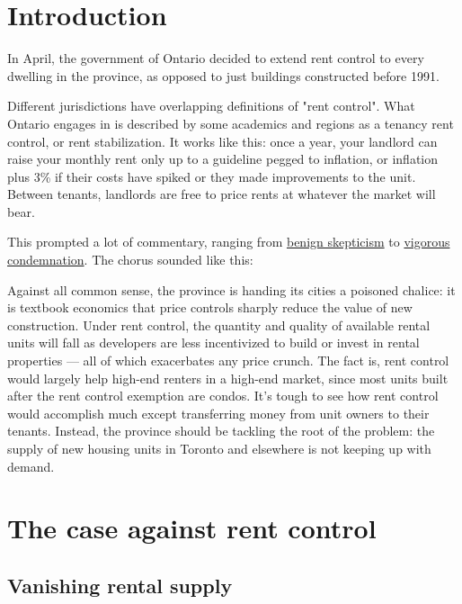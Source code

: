 \section{Introduction}

In April, the government of Ontario decided to extend rent control to every dwelling in the province, as opposed to just buildings constructed before 1991.

Different jurisdictions have overlapping definitions of "rent control". What Ontario engages in is described by some academics and regions as a tenancy rent control, or rent stabilization. It works like this: once a year, your landlord can raise your monthly rent only up to a guideline pegged to inflation, or inflation plus 3\% if their costs have spiked or they made improvements to the unit. Between tenants, landlords are free to price rents at whatever the market will bear.\cite{ltb-2017}

This prompted a lot of commentary, ranging from \href{http://tvo.org/article/current-affairs/the-next-ontario/ontario-needs-a-rental-rethink-but-should-tread-carefully}{benign skepticism} to \href{https://beta.theglobeandmail.com/real-estate/toronto/new-ontario-rent-control-rules-exact-opposite-of-what-is-needed-analyst-warns/article34569276/}{vigorous condemnation}. The chorus sounded like this:

Against all common sense, the province is handing its cities a poisoned chalice: it is textbook economics that price controls sharply reduce the value of new construction.\cite{gee-2017}  Under rent control, the quantity and quality of available rental units will fall as developers are less incentivized to build or invest in rental properties --- all of which exacerbates any price crunch.\cite{tal-2017} The fact is, rent control would largely help high-end renters in a high-end market, since most units built after the rent control exemption are condos. It’s tough to see how rent control would accomplish much except transferring money from unit owners to their tenants.\cite{selley} Instead, the province should be tackling the root of the problem: the supply of new housing units in Toronto and elsewhere is not keeping up with demand.\cite{thesun}



\section{The case against rent control}
\subsection{Vanishing rental supply}


